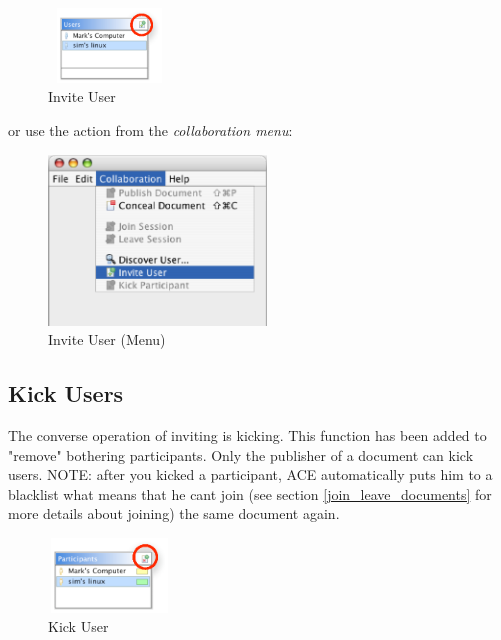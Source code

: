 \documentclass[11pt,a4paper]{article}
\begin{document}
\begin{figure}[H]
\begin{center}
  \includegraphics[height=0.78in, width=1.28in]{../images/usermanual/g_uview_invite.eps}
\caption{Invite User}
\label{default}
\end{center}
\end{figure}

or use the action from the \textit{collaboration menu}:

\begin{figure}[H]
\begin{center}
  \includegraphics[height=1.78in, width=2.28in]{../images/usermanual/menu_collab_invite.eps}
\caption{Invite User (Menu)}
\label{default}
\end{center}
\end{figure}

\subsection{Kick Users}
The converse operation of inviting is kicking. This function has been added to "remove" bothering participants. Only the publisher of a document can kick users. NOTE: after you kicked a participant, ACE automatically puts him to a blacklist what means that he cant join (see section \ref{join_leave_documents} for more details about joining) the same document again.

\begin{figure}[H]
\begin{center}
  \includegraphics[height=0.78in, width=1.28in]{../images/usermanual/g_pview_kick.eps}
\caption{Kick User}
\label{default}
\end{center}
\end{figure}
\end{document}
